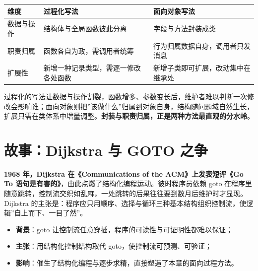 \documentclass[
]{ctexbook}
\providecommand{\tightlist}{\setlength{\itemsep}{0pt}\setlength{\parskip}{0pt} }
\newcounter{none}
\begin{document}
{\def\LTcaptype{none} %
\begin{longtable}[]{@{}
  >{\raggedright\arraybackslash}p{}
  >{\raggedright\arraybackslash}p{}
  >{\raggedright\arraybackslash}p{}@{}}
\toprule\noalign{}
\begin{minipage}[b]{\linewidth}\raggedright
维度
\end{minipage} & \begin{minipage}[b]{\linewidth}\raggedright
过程化写法
\end{minipage} & \begin{minipage}[b]{\linewidth}\raggedright
面向对象写法
\end{minipage} \\
\midrule\noalign{}
\endhead
\bottomrule\noalign{}
\endlastfoot
数据与操作 & 结构体与全局函数彼此分离 & 字段与方法封装成类 \\
职责归属 & 函数各自为政，需调用者统筹 &
行为归属数据自身，调用者只发消息 \\
扩展性 & 新增一种记录类型，需逐一修改各处函数 &
新增子类即可扩展，改动集中在继承处 \\
\end{longtable}
}

过程化的写法让数据与操作割裂，函数增多、参数变长后，维护者难以判断一次修改会影响谁；面向对象则把''该做什么''归属到对象自身，结构随问题域自然生长，扩展只需在类体系中增量调整。\textbf{封装与职责归属，正是两种方法最直观的分水岭}。

\section{故事：Dijkstra 与 GOTO
之争}\label{ux6545ux4e8bdijkstra-ux4e0e-goto-ux4e4bux4e89}

\textbf{1968 年，Dijkstra 在《Communications of the ACM》上发表短评《Go
To 语句是有害的》}，由此点燃了结构化编程运动。彼时程序员依赖 goto
在程序里随意跳转，控制流交织如乱麻，一处跳转的后果往往要到数月后维护时才显现。Dijkstra
的主张是：程序应只用顺序、选择与循环三种基本结构组织控制流，使逻辑''自上而下、一目了然''。

\begin{itemize}
\tightlist
\item
  \textbf{背景}：goto
  让控制流任意穿插，程序的可读性与可证明性都难以保证；
\item
  \textbf{主张}：用结构化控制结构取代 goto，使控制流可预测、可验证；
\item
  \textbf{影响}：催生了结构化编程与逐步求精，直接塑造了本章的面向过程方法。
\end{itemize}
\end{document}
